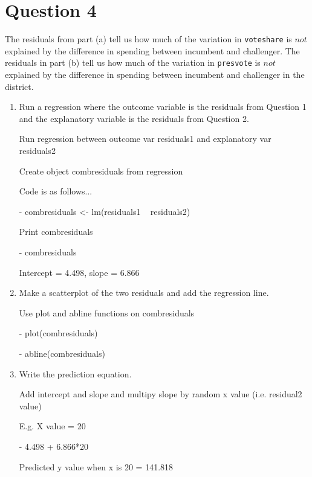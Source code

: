 \documentclass[12pt,letterpaper]{article}
\begin{document}
\section*{Question 4}%
\noindent The residuals from part (a) tell us how much of the variation in \texttt{voteshare} is $not$ explained by the difference in spending between incumbent and challenger. The residuals in part (b) tell us how much of the variation in \texttt{presvote} is $not$ explained by the difference in spending between incumbent and challenger in the district.
	\begin{enumerate}
		\item Run a regression where the outcome variable is the residuals from Question 1 and the explanatory variable is the residuals from Question 2.	\vspace{6cm}
		
		Run regression between outcome var residuals1 and explanatory var residuals2
		
		Create object combresiduals from regression
		
		Code is as follows...
		
	- combresiduals <- lm(residuals1 ~ residuals2)
	
	Print combresiduals
	
	-	combresiduals 
	
	Intercept = 4.498, slope = 6.866
		
		\item Make a scatterplot of the two residuals and add the regression line. 	\vspace{6cm}
		
		Use plot and abline functions on combresiduals
		
	-	plot(combresiduals)
		
	-	abline(combresiduals)
	
		\item Write the prediction equation.
		
		Add intercept and slope and multipy slope by random x value (i.e. residual2 value)
		
		E.g. X value = 20
		
		- 4.498 + 6.866*20
	
	Predicted y value when x is 20 = 141.818
	
\end{enumerate}
	
	\newpage	
\end{document}
